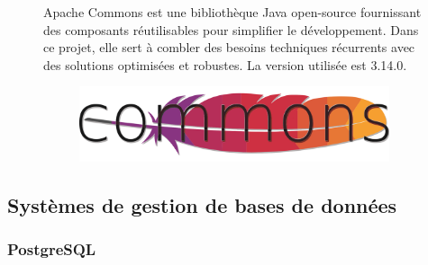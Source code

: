 \documentclass[12pt,a4paper]{report}
\begin{document}
	\begin{figure}[H]
		\begin{minipage}{0.8\textwidth}
			Apache Commons est une bibliothèque Java open-source fournissant des composants réutilisables pour simplifier le développement. Dans ce projet, elle sert à combler des besoins techniques récurrents avec des solutions optimisées et robustes. La version utilisée est 3.14.0.
		\end{minipage}
		\hfill
		\begin{minipage}{0.15\textwidth} 
			\begin{figure}[H]
				\centering
				\includegraphics[width=\linewidth]{apache-commons-logo.png}
				\label{fig:apache-commons-logo}
			\end{figure}
		\end{minipage}
	\end{figure}
	
	\subsection{Systèmes de gestion de bases de données}
	
	\subsubsection{PostgreSQL}
	
\end{document}

